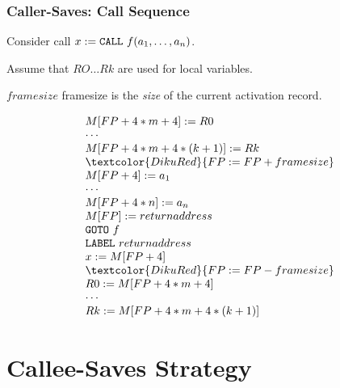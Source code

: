 \documentclass{beamer}
\newcommand{\emp}[1]{\textcolor{DikuRed}{ #1}}
\begin{document}
\begin{frame}
\frametitle{Caller-Saves: Call Sequence}

Consider call $x := {\tt CALL}~f(a_1,\ldots,a_n)$.

Assume that $RO \ldots Rk$ are used for local variables. 

$framesize$ framesize is the {\em size} of the current activation record.


\vspace{0.5ex}

\renewcommand{\arraystretch}{0.87}
\[\begin{array}{l}
M[FP+4*m+4] := R0 \\
\cdots \\
M[FP+4*m+4*(k+1)] := Rk \\
\emp{FP := FP + framesize} \\
M[FP + 4] := a_1 \\
\cdots \\
M[FP + 4*n] := a_n \\
M[FP] := returnaddress \\
{\tt GOTO}~f \\
{\tt LABEL}~returnaddress \\
x := M[FP+4] \\
\emp{FP := FP - framesize} \\
R0 := M[FP+4*m+4] \\
\cdots \\
Rk := M[FP+4*m+4*(k+1)]
\end{array}\]

\end{frame}



\section{Callee-Saves Strategy}

\begin{frame}[fragile]
	\tableofcontents[currentsection]
\end{frame}
\end{document}
